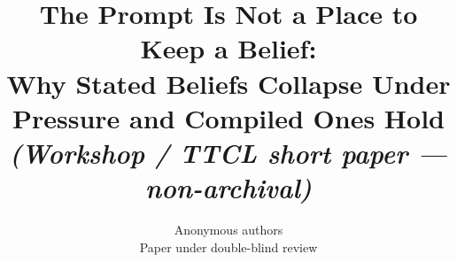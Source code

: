 \documentclass{article}
\title{The Prompt Is Not a Place to Keep a Belief: \\
Why Stated Beliefs Collapse Under Pressure and Compiled Ones Hold \\
{\large \textit{(Workshop / TTCL short paper — non-archival)}}}
\author{Anonymous authors \\ Paper under double-blind review}
\makeatletter
\newcommand{\exprefcode}[1]{%
  \@nameuse{expcode@#1}%
}
\newcommand{\expref}[1]{\hyperref[#1]{(Exp.~\exprefcode{#1})}}
\makeatother
\begin{document}
\maketitle


\label{app:exp-main}\label{app:exp-a1}\label{app:exp-a3}\label{app:exp-b1}%
\label{app:exp-b2}\label{app:exp-b3}\label{app:exp-c1}\label{app:exp-c2}%
\label{app:exp-c2b}\label{app:exp-c3}\label{app:exp-e1}\label{app:exp-e1b}%
\label{app:exp-e2}\label{app:exp-e3}\label{app:exp-disc}\label{app:exp-mmlu}%
\label{app:exp-sc1}\label{app:exp-lineup}\label{app:exp-inject}














\end{document}
